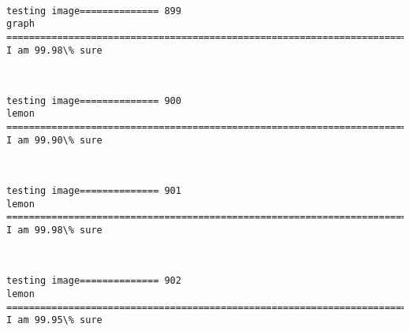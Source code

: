 \documentclass[11pt]{article}
\begin{document}
    \begin{center}
    \end{center}
    { \hspace*{\fill} \\}
    
    \begin{Verbatim}[commandchars=\\\{\}]
testing image============== 899
graph
============================================================================
I am 99.98\% sure

    \end{Verbatim}

    \begin{center}
    \end{center}
    { \hspace*{\fill} \\}
    
    \begin{Verbatim}[commandchars=\\\{\}]
testing image============== 900
lemon
============================================================================
I am 99.90\% sure

    \end{Verbatim}

    \begin{center}
    \end{center}
    { \hspace*{\fill} \\}
    
    \begin{Verbatim}[commandchars=\\\{\}]
testing image============== 901
lemon
============================================================================
I am 99.98\% sure

    \end{Verbatim}

    \begin{center}
    \end{center}
    { \hspace*{\fill} \\}
    
    \begin{Verbatim}[commandchars=\\\{\}]
testing image============== 902
lemon
============================================================================
I am 99.95\% sure

    \end{Verbatim}
\end{document}
